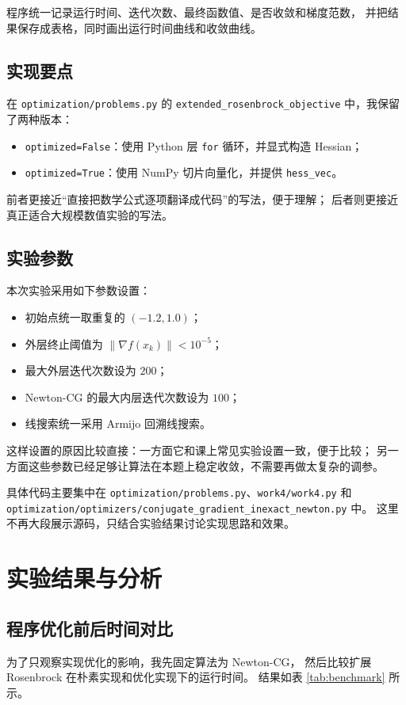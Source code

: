 \documentclass[12pt,a4paper]{ctexart}
\begin{document}
程序统一记录运行时间、迭代次数、最终函数值、是否收敛和梯度范数，
并把结果保存成表格，同时画出运行时间曲线和收敛曲线。

\subsection{实现要点}
在 \texttt{optimization/problems.py} 的 \texttt{extended\_rosenbrock\_objective} 中，我保留了两种版本：
\begin{itemize}
  \item \texttt{optimized=False}：使用 Python 层 \texttt{for} 循环，并显式构造 Hessian；
  \item \texttt{optimized=True}：使用 NumPy 切片向量化，并提供 \texttt{hess\_vec}。
\end{itemize}

前者更接近“直接把数学公式逐项翻译成代码”的写法，便于理解；
后者则更接近真正适合大规模数值实验的写法。

\subsection{实验参数}
本次实验采用如下参数设置：
\begin{itemize}
  \item 初始点统一取重复的 \((-1.2,1.0)\)；
  \item 外层终止阈值为 \(\|\nabla f(x_k)\|<10^{-5}\)；
  \item 最大外层迭代次数设为 \(200\)；
  \item Newton-CG 的最大内层迭代次数设为 \(100\)；
  \item 线搜索统一采用 Armijo 回溯线搜索。
\end{itemize}

这样设置的原因比较直接：一方面它和课上常见实验设置一致，便于比较；
另一方面这些参数已经足够让算法在本题上稳定收敛，不需要再做太复杂的调参。

具体代码主要集中在 \texttt{optimization/problems.py}、\texttt{work4/work4.py} 和
\texttt{optimization/optimizers/conjugate\_gradient\_inexact\_newton.py} 中。
这里不再大段展示源码，只结合实验结果讨论实现思路和效果。

\section{实验结果与分析}
\subsection{程序优化前后时间对比}
为了只观察实现优化的影响，我先固定算法为 Newton-CG，
然后比较扩展 Rosenbrock 在朴素实现和优化实现下的运行时间。
结果如表 \ref{tab:benchmark} 所示。
\end{document}
